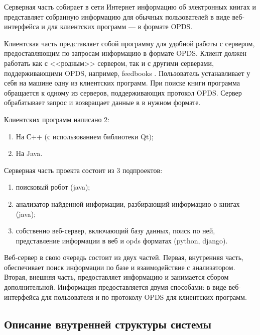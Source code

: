 Серверная часть собирает в сети Интернет информацию об электронных книгах и представляет собранную информацию для обычных пользователей в виде веб-интерфейса и для клиентских программ --- в формате OPDS.

Клиентская часть представляет собой программу для удобной работы с сервером, предоставляющим по запросам информацию в формате OPDS. Клиент должен работать как с <<родным>> сервером, так и с другими серверами, поддерживающими OPDS, например, feedbooks \cite{feedbooks}.
Пользователь устанавливает у себя на машине одну из клиентских программ. При поиске книги программа обращается к одному из серверов, поддерживающих протокол OPDS. Сервер обрабатывает запрос и возвращает данные в в нужном формате. 

Клиентских программ написано 2:
\begin{enumerate}
	\item На С++ (с использованием библиотеки Qt);
	\item На Java.
\end{enumerate}

Серверная часть проекта состоит из 3 подпроектов:
\begin{enumerate}
	\item поисковый робот (java);
	\item анализатор найденной информации, разбирающий информацию о книгах (java);
	\item собственно веб-сервер, включающий базу данных, поиск по ней, представление информации в веб и opds форматах (python, django).
\end{enumerate}

Веб-сервер в свою очередь состоит из двух частей. Первая, внутренняя часть, обеспечивает поиск информации по базе и взаимодействие с анализатором.
Вторая, внешняя часть, предоставляет информацию и занимается сбором дополнительной. Информация предоставляется двумя способами: в виде веб-интерфейса для пользователя и по протоколу OPDS для клиентских программ.


		
\subsection{Описание внутренней структуры системы}


